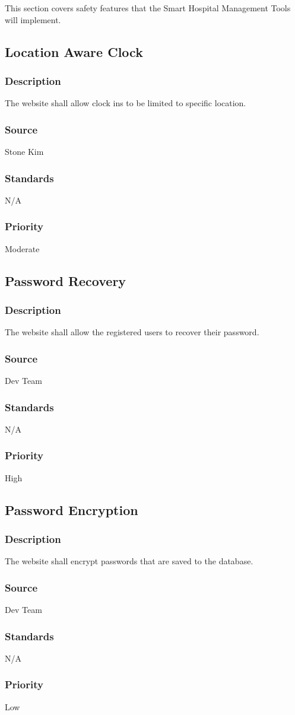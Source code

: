 This section covers safety features that the Smart Hospital Management Tools will implement.

\subsection{Location Aware Clock}
\subsubsection{Description}
The website shall allow clock ins to be limited to specific location.
\subsubsection{Source}
Stone Kim
\subsubsection{Standards}
N/A
\subsubsection{Priority}
Moderate

\subsection{Password Recovery}
\subsubsection{Description}
The website shall allow the registered users to recover their password.
\subsubsection{Source}
Dev Team
\subsubsection{Standards}
N/A
\subsubsection{Priority}
High

\subsection{Password Encryption}
\subsubsection{Description}
The website shall encrypt passwords that are saved to the database.
\subsubsection{Source}
Dev Team
\subsubsection{Standards}
N/A
\subsubsection{Priority}
Low
